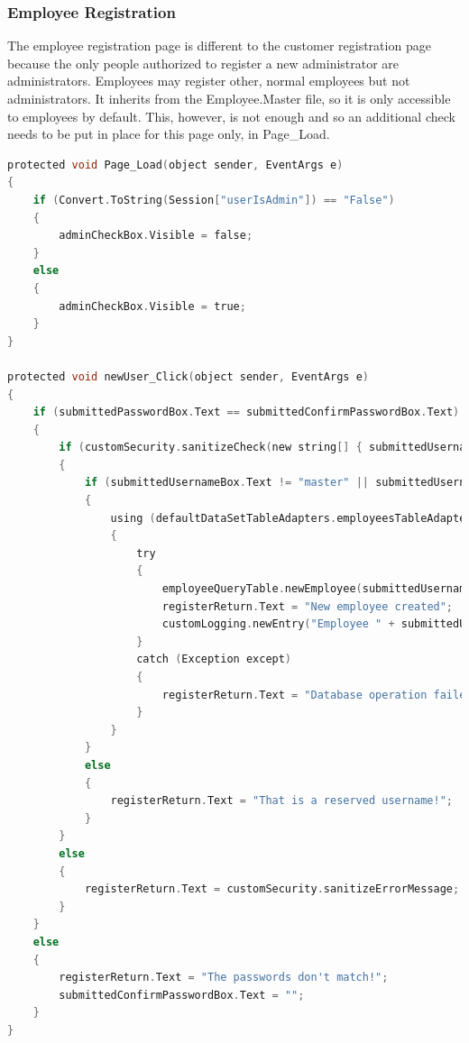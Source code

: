 ﻿\documentclass{article}
\begin{document}
    \subsubsection{Employee Registration}
    The employee registration page is different to the customer registration page because the only people authorized to register a new administrator are administrators.
    Employees may register other, normal employees but not administrators.
    It inherits from the Employee.Master file, so it is only accessible to employees by default.
    This, however, is not enough and so an additional check needs to be put in place for this page only, in Page\_Load.
    \begin{lstlisting}[language=C]
protected void Page_Load(object sender, EventArgs e)
{
    if (Convert.ToString(Session["userIsAdmin"]) == "False")
    {
        adminCheckBox.Visible = false;
    }
    else
    {
        adminCheckBox.Visible = true;
    }
}

protected void newUser_Click(object sender, EventArgs e)
{
    if (submittedPasswordBox.Text == submittedConfirmPasswordBox.Text)
    {
        if (customSecurity.sanitizeCheck(new string[] { submittedUsernameBox.Text, submittedPasswordBox.Text, forenameBox.Text, surnameBox.Text }))
        {
            if (submittedUsernameBox.Text != "master" || submittedUsernameBox.Text != "Market")
            {
                using (defaultDataSetTableAdapters.employeesTableAdapter employeeQueryTable = new defaultDataSetTableAdapters.employeesTableAdapter())
                {
                    try
                    {
                        employeeQueryTable.newEmployee(submittedUsernameBox.Text, customSecurity.generateMD5(submittedPasswordBox.Text), adminCheckBox.Checked, forenameBox.Text, surnameBox.Text);
                        registerReturn.Text = "New employee created";
                        customLogging.newEntry("Employee " + submittedUsernameBox.Text + " was created");
                    }
                    catch (Exception except)
                    {
                        registerReturn.Text = "Database operation failed with error " + except.Message;
                    }
                }
            }
            else
            {
                registerReturn.Text = "That is a reserved username!";
            }
        }
        else
        {
            registerReturn.Text = customSecurity.sanitizeErrorMessage;
        }
    }
    else
    {
        registerReturn.Text = "The passwords don't match!";
        submittedConfirmPasswordBox.Text = "";
    }
}
    \end{lstlisting}
\end{document}
